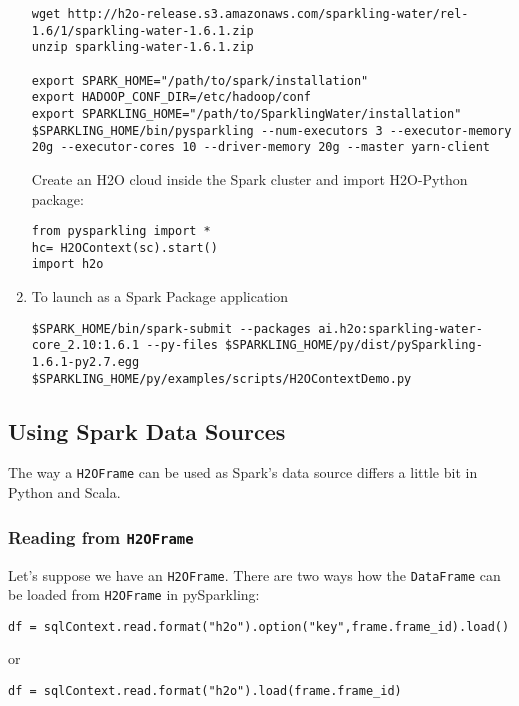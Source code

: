 \begin{enumerate}
\begin{lstlisting}[style=Bash]
wget http://h2o-release.s3.amazonaws.com/sparkling-water/rel-1.6/1/sparkling-water-1.6.1.zip
unzip sparkling-water-1.6.1.zip
 
export SPARK_HOME="/path/to/spark/installation"
export HADOOP_CONF_DIR=/etc/hadoop/conf
export SPARKLING_HOME="/path/to/SparklingWater/installation"
$SPARKLING_HOME/bin/pysparkling --num-executors 3 --executor-memory 20g --executor-cores 10 --driver-memory 20g --master yarn-client
\end{lstlisting}
    
Create an H2O cloud inside the Spark cluster and import H2O-Python package:
\begin{lstlisting}[style=Scala]
from pysparkling import *
hc= H2OContext(sc).start()
import h2o
\end{lstlisting}

\item To launch as a Spark Package application
\begin{lstlisting}[style=Bash]
$SPARK_HOME/bin/spark-submit --packages ai.h2o:sparkling-water-core_2.10:1.6.1 --py-files $SPARKLING_HOME/py/dist/pySparkling-1.6.1-py2.7.egg
$SPARKLING_HOME/py/examples/scripts/H2OContextDemo.py 
\end{lstlisting}
\end{enumerate}

\subsection{Using Spark Data Sources}

The way a \texttt{H2OFrame} can be used as Spark's data source differs a little bit in Python and Scala.

\subsubsection{Reading from \texttt{H2OFrame}}

Let's suppose we have an \texttt{H2OFrame}. There are two ways how the \texttt{DataFrame} can be loaded from \texttt{H2OFrame} in pySparkling:
\begin{lstlisting}[style=Scala]
df = sqlContext.read.format("h2o").option("key",frame.frame_id).load()
\end{lstlisting}
or
\begin{lstlisting}[style=Scala]
df = sqlContext.read.format("h2o").load(frame.frame_id)
\end{lstlisting}


